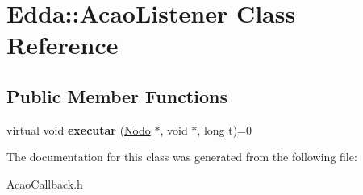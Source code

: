\hypertarget{class_edda_1_1_acao_listener}{
\section{Edda::AcaoListener Class Reference}
\label{class_edda_1_1_acao_listener}
}
\subsection*{Public Member Functions}
\begin{DoxyCompactItemize}
\item 
\hypertarget{class_edda_1_1_acao_listener_ad77d35a56da6eafcb3597713594dad23}{
virtual void {\bfseries executar} (\hyperlink{class_edda_1_1_nodo}{Nodo} $\ast$, void $\ast$, long t)=0}
\label{class_edda_1_1_acao_listener_ad77d35a56da6eafcb3597713594dad23}

\end{DoxyCompactItemize}


The documentation for this class was generated from the following file:\begin{DoxyCompactItemize}
\item 
AcaoCallback.h\end{DoxyCompactItemize}
